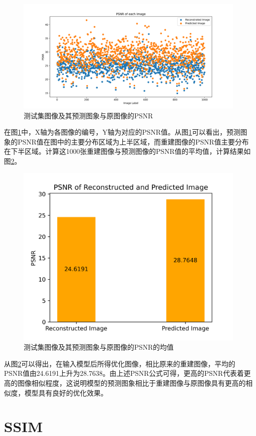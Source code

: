  \begin{figure}[h]
 	\centering
 	\includegraphics[width=0.9\columnwidth]{image/chap06/img603.png}
 	\caption{测试集图像及其预测图象与原图像的PSNR}
 	\label{fig603}
 \end{figure}

在图\ref{fig603}中，X轴为各图像的编号，Y轴为对应的PSNR值。从图\ref{fig603}可以看出，预测图象的PSNR值在图中的主要分布区域为上半区域，而重建图像的PSNR值主要分布在下半区域。计算这1000张重建图像与预测图像的PSNR值的平均值，计算结果如图\ref{fig604}。

\begin{figure}[h]
	\centering
	\includegraphics[width=0.75\columnwidth]{image/chap06/img604.png}
	\caption{测试集图像及其预测图象与原图像的PSNR的均值}
	\label{fig604}
\end{figure}

从图\ref{fig604}可以得出，在输入模型后所得优化图像，相比原来的重建图像，平均的PSNR值由24.6191上升为28.7638。由上述PSNR公式可得，更高的PSNR代表着更高的图像相似程度，这说明模型的预测图象相比于重建图像与原图像具有更高的相似度，模型具有良好的优化效果。

\section{SSIM}
